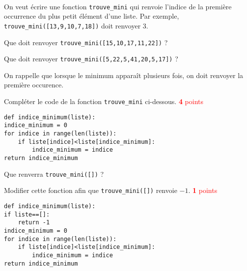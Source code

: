 \documentclass[11pt,a4paper]{article}
\begin{document}
\vspace{0.2cm}
\\
On veut écrire une fonction {\tt trouve\_mini} qui renvoie l'indice de la première occurrence du plus petit élément d'une liste. Par exemple, {\tt trouve\_mini([13,9,10,7,18])} doit renvoyer 3.
\QListe
\item Que doit renvoyer {\tt trouve\_mini([15,10,17,11,22])} ?
\item Que doit renvoyer {\tt trouve\_mini([5,22,5,41,20,5,17])} ? \\
\item {}
\aide \; On rappelle que lorsque le minimum apparaît plusieurs fois, on doit renvoyer la première occurence.
\item Compléter le code de la fonction {\tt trouve\_mini} ci-dessous.
\pagebreak
\textcolor{red}{\textbf 4 points}
\begin{lstlisting}
def indice_minimum(liste):
indice_minimum = 0
for indice in range(len(liste)):
    if liste[indice]<liste[indice_minimum]:
        indice_minimum = indice
return indice_minimum
\end{lstlisting}
\item Que renverra {\tt trouve\_mini([])} ?
\item Modifier cette fonction afin que {\tt trouve\_mini([])} renvoie $-1$.
\textcolor{red}{\textbf 1 points}
\begin{lstlisting}
def indice_minimum(liste):
if liste==[]:
    return -1
indice_minimum = 0
for indice in range(len(liste)):
    if liste[indice]<liste[indice_minimum]:
        indice_minimum = indice
return indice_minimum
\end{lstlisting}
\FinListe

\vspace{0.2cm}
\end{document}
